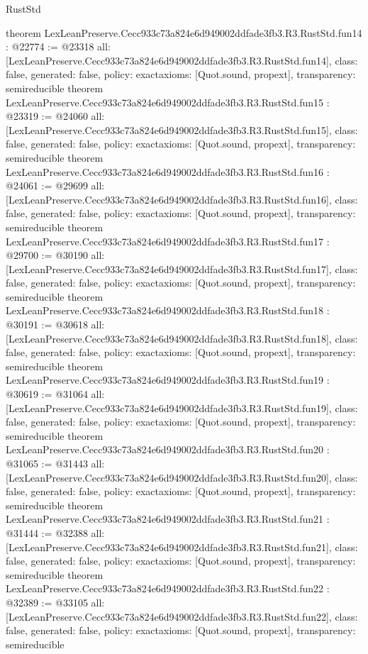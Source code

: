 \begin{lexlean}{RustStd}
\begin{coremodule}
{}
theorem LexLeanPreserve.Cecc933c73a824e6d949002ddfade3fb3.R3.RustStd.fun14 : @22774 := @23318 {
  all: [LexLeanPreserve.Cecc933c73a824e6d949002ddfade3fb3.R3.RustStd.fun14],
  class: false,
  generated: false,
  policy: exact{axioms: [Quot.sound, propext]},
  transparency: semireducible
}
theorem LexLeanPreserve.Cecc933c73a824e6d949002ddfade3fb3.R3.RustStd.fun15 : @23319 := @24060 {
  all: [LexLeanPreserve.Cecc933c73a824e6d949002ddfade3fb3.R3.RustStd.fun15],
  class: false,
  generated: false,
  policy: exact{axioms: [Quot.sound, propext]},
  transparency: semireducible
}
theorem LexLeanPreserve.Cecc933c73a824e6d949002ddfade3fb3.R3.RustStd.fun16 : @24061 := @29699 {
  all: [LexLeanPreserve.Cecc933c73a824e6d949002ddfade3fb3.R3.RustStd.fun16],
  class: false,
  generated: false,
  policy: exact{axioms: [Quot.sound, propext]},
  transparency: semireducible
}
theorem LexLeanPreserve.Cecc933c73a824e6d949002ddfade3fb3.R3.RustStd.fun17 : @29700 := @30190 {
  all: [LexLeanPreserve.Cecc933c73a824e6d949002ddfade3fb3.R3.RustStd.fun17],
  class: false,
  generated: false,
  policy: exact{axioms: [Quot.sound, propext]},
  transparency: semireducible
}
theorem LexLeanPreserve.Cecc933c73a824e6d949002ddfade3fb3.R3.RustStd.fun18 : @30191 := @30618 {
  all: [LexLeanPreserve.Cecc933c73a824e6d949002ddfade3fb3.R3.RustStd.fun18],
  class: false,
  generated: false,
  policy: exact{axioms: [Quot.sound, propext]},
  transparency: semireducible
}
theorem LexLeanPreserve.Cecc933c73a824e6d949002ddfade3fb3.R3.RustStd.fun19 : @30619 := @31064 {
  all: [LexLeanPreserve.Cecc933c73a824e6d949002ddfade3fb3.R3.RustStd.fun19],
  class: false,
  generated: false,
  policy: exact{axioms: [Quot.sound, propext]},
  transparency: semireducible
}
theorem LexLeanPreserve.Cecc933c73a824e6d949002ddfade3fb3.R3.RustStd.fun20 : @31065 := @31443 {
  all: [LexLeanPreserve.Cecc933c73a824e6d949002ddfade3fb3.R3.RustStd.fun20],
  class: false,
  generated: false,
  policy: exact{axioms: [Quot.sound, propext]},
  transparency: semireducible
}
theorem LexLeanPreserve.Cecc933c73a824e6d949002ddfade3fb3.R3.RustStd.fun21 : @31444 := @32388 {
  all: [LexLeanPreserve.Cecc933c73a824e6d949002ddfade3fb3.R3.RustStd.fun21],
  class: false,
  generated: false,
  policy: exact{axioms: [Quot.sound, propext]},
  transparency: semireducible
}
theorem LexLeanPreserve.Cecc933c73a824e6d949002ddfade3fb3.R3.RustStd.fun22 : @32389 := @33105 {
  all: [LexLeanPreserve.Cecc933c73a824e6d949002ddfade3fb3.R3.RustStd.fun22],
  class: false,
  generated: false,
  policy: exact{axioms: [Quot.sound, propext]},
  transparency: semireducible
}
\end{coremodule}
\end{lexlean}

